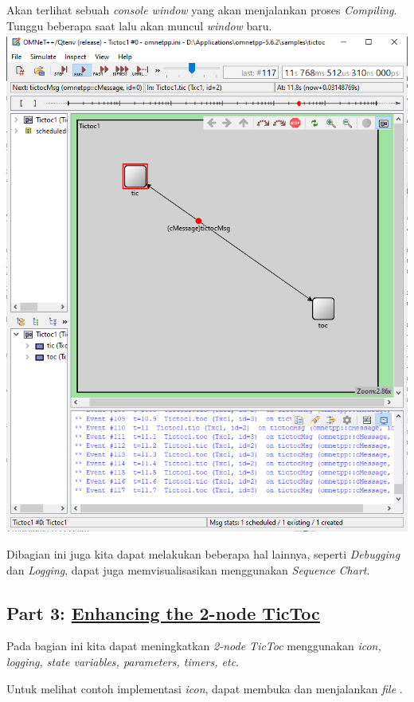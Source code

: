 \documentclass[conference]{IEEEtran}
\begin{document}
Akan terlihat sebuah \textit{console window} yang akan menjalankan proses \textit{Compiling}. Tunggu beberapa saat lalu akan muncul \textit{window} baru.\break \includegraphics[scale=0.35]{images/simulation-window.png}

Dibagian ini juga kita dapat melakukan beberapa hal lainnya, seperti \textit{Debugging} dan \textit{Logging}, dapat juga memvisualisasikan menggunakan \textit{Sequence Chart}.

\subsection{Part 3: \href{https://docs.omnetpp.org/tutorials/tictoc/part3/}{Enhancing the 2-node TicToc}}
Pada bagian ini kita dapat meningkatkan \textit{2-node TicToc} menggunakan \textit{icon, logging, state variables, parameters, timers, etc}.

Untuk melihat contoh implementasi \textit{icon}, dapat membuka  dan menjalankan \textit{file} .\break
\end{document}
